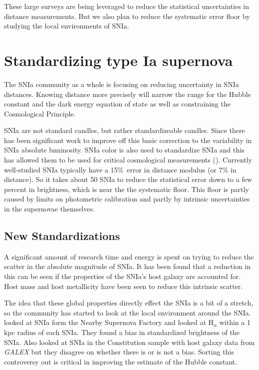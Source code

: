 \documentclass[apj, iop]{emulateapj}
\newcommand{\sn}{SNIa}
\begin{document}
These large surveys are being leveraged to reduce the statistical uncertainties in distance
measurements. But we also plan to reduce the systematic error floor by studying the
local environments of SNIa.

\section{Standardizing type Ia
supernova}\label{standardizing-type-ia-supernova}

The \sn{} community as a whole is focusing on reducing uncertainty in SNIa
distances. Knowing distance more precisely will narrow the range for the Hubble
constant and the dark energy equation of state as well as
constraining the Cosmological Principle.

\sn{} are not standard candles, but rather standardizeable candles. Since
\cite{Phillips93} there has been significant work to improve off this basic correction to the
variability in \sn{} absolute luminosity. \sn{} color is also used to standardize \sn{} and
this has allowed them to be used for critical cosmological measurements
(\citep{Riess98, Perlmutter99}). Currently well-studied \sn{} typically have a
15\%\ error in distance modulus (or 7\% in distance). So it takes about 50 SNIa
to reduce the statistical error down to a few percent in brightness, which is near the 
the systematic floor. This floor is partly caused by limits on photometric calibration and
partly by intrinsic uncertainties in the supernovae themselves.

\subsection{New Standardizations}\label{new-standardizations}

A significant amount of research time and energy is spent on trying to reduce
the scatter in the absolute magnitude of SNIa. It has been found that a
reduction in this can be seen if the properties of the SNIa's host galaxy are
accounted for. Host mass \citep{Childress13} and host metallicity \citep{Hayden13}
have been seen to reduce this intrinsic scatter.

The idea that these global properties directly effect the \sn{} is a bit of a
stretch, so the community has started to look at the local environment around
the SNIa. \cite{Rigault13} looked at \sn{} form the Nearby Supernova Factory and
looked at H$_{\alpha}$ within a 1 kpc radius of each SNIa. They found  a bias in
standardized brightness of the SNIa. Also \cite{Rigault15, Jones15} looked at
\sn{} in the Constitution sample with host galaxy data from {\it GALEX} but they
disagree on whether there is or is not a bias. Sorting this controversy out is
critical in improving the estimate of the Hubble constant.
\end{document}
